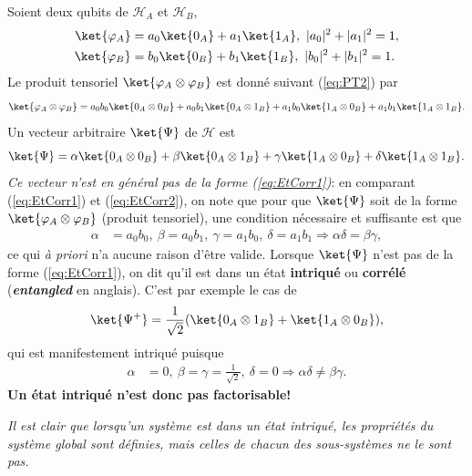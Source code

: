 Soient deux qubits de $\mathcal{H}_{A}$ et $\mathcal{H}_{B}$,
\begin{subequations}
\begin{align}
\ket{\varphi_{A}} & =a_{0}\ket{0_{A}}+a_{1}\ket{1_{A}} ,\ |a_{0}|^{2}+
|a_{1}|^{2}=1,\\
\ket{\varphi_{B}} & =b_{0}\ket{0_{B}}+b_{1}\ket{1_{B}} ,\ |b_{0}|^{2}+
|b_{1}|^{2}=1.
\end{align}%
\end{subequations}%
Le produit tensoriel
$\ket{\varphi_{A}\otimes\varphi_{B}}$ est donné suivant (\ref{eq:PT2}) par
\begin{equation}
\ket{\varphi_{A}\otimes\varphi_{B}}=a_{0}b_{0}\ket{0_{A}\otimes0_{B}}
+a_{0}b_{1}\ket{0_{A}\otimes1_{B}}+a_{1}b_{0}\ket{1_{A}\otimes0_{B}}
+a_{1}b_{1}\ket{1_{A}\otimes1_{B}}.
 \label{eq:EtCorr1}%
\end{equation}
Un vecteur arbitraire $\ket{\Psi}$ de $\mathcal{H}$ est%
\begin{equation}
\ket{\Psi}=\alpha\ket{0_{A}\otimes0_{B}}+\beta\ket{0_{A}\otimes1_{B}}
+\gamma\ket{1_{A}\otimes0_{B}} +\delta\ket{1_{A}\otimes1_{B}}.
\label{eq:EtCorr2}%
\end{equation}
\emph{Ce vecteur n'est en général pas de la forme (\ref{eq:EtCorr1})}: en
comparant (\ref{eq:EtCorr1}) et (\ref{eq:EtCorr2}), on note que pour que
$\ket{\Psi}$ soit de la forme $\ket{\varphi_{A}\otimes\varphi_{B}}$ (produit
tensoriel), une condition nécessaire et suffisante est que%
\begin{align}
\alpha &  =a_{0}b_{0},\ \beta=a_{0}b_{1},\ \gamma=a_{1}b_{0},\ \delta
=a_{1}b_{1} \Rightarrow\alpha\delta  =\beta\gamma,
\end{align}%
ce qui \emph{à priori} n'a aucune raison d'être valide. Lorsque $\ket{\Psi}$
n'est pas de la forme (\ref{eq:EtCorr1}), on dit qu'il est dans un état
\textbf{intriqué} ou \textbf{corrélé} (\textbf{\emph{entangled}} en anglais).
C'est par exemple le cas de%
\begin{equation}
\ket{\Psi^+}=\frac{1}{\sqrt{2}}(\ket{0_{A}\otimes1_{B}}
+\ket{1_{A}\otimes0_{B}}),
\label{eq:Bell01}
\end{equation}
qui est manifestement intriqué puisque%
\begin{align}
\alpha &  =0,\ \beta=\gamma=\frac{1}{\sqrt{2}},\ \delta=0 \Rightarrow
\alpha\delta \neq\beta\gamma.
\end{align}%
\textbf{Un état intriqué n'est donc pas factorisable!}

\medskip\colorbox[gray]{0.8}{
\parbox[c]{0.9\textwidth}{
\emph{Il est clair que lorsqu'un système est dans un état intriqué, les
propriétés du système global sont définies, mais celles de chacun des
sous-systèmes ne le sont pas.}
}}\medskip

